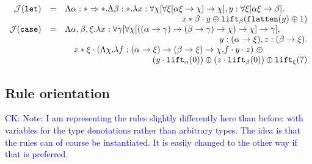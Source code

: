 \documentclass[runningheads,a4paper]{llncs}
\newcommand{\Termmap}{\mathcal{J}}
\newcommand{\quant}[2]{\forall #1[#2]}
\newcommand{\arrtype}{\rightarrow}
\newcommand{\arrkind}{\Rightarrow}
\newcommand{\abs}[2]{\lambda #1.#2}
\newcommand{\flatten}{\mathtt{flatten}}
\newcommand{\lift}{\mathtt{lift}}
\newcommand{\CK}[1]{\textcolor{blue}{CK: #1}}
\begin{document}
\[
\begin{array}{rcl}
\Termmap(\mathtt{let}) & = & \Lambda \alpha : * \arrkind * . \Lambda \beta : * . \lambda x : \quant{\chi}{
  \quant{\xi}{\alpha\xi \arrtype \chi} \arrtype \chi},
  y : \quant{\xi}{\alpha\xi \arrtype \beta}. \\
  & & \hfill x * \beta \cdot y \oplus \lift_{\beta}(\flatten(y) \oplus
  1) \\
\Termmap(\mathtt{case}) & = & \Lambda \alpha,\beta,\xi . \lambda x :
  \quant{\gamma}{\quant{\chi}{((\alpha \arrtype \gamma) \arrtype (\beta
  \arrtype \gamma) \arrtype \chi) \arrtype \chi} \arrtype \gamma},\\
  & & \phantom{A}\hfill
  y : (\alpha \arrtype \xi), z : (\beta \arrtype \xi). \\
  & & \quad
  x * \xi \cdot (\Lambda \chi.\abs{f:(\alpha \arrtype \xi) \arrtype
  (\beta \arrtype \xi) \arrtype \chi}{f \cdot y \cdot z})\ \oplus \\
  & & \quad\phantom{ABCDEFGHIJKL}
    (y \cdot \lift_\alpha(0)) \oplus (z \cdot \lift_\beta(0)) \oplus
    \lift_\xi(7) \\
\end{array}
\]

\subsection{Rule orientation}

\CK{Note: I am representing the rules slightly differently here than
before: with variables for the type denotations rather than arbitrary
types.  The idea is that the rules can of course be instantiated.  It
is easily changed to the other way if that is preferred.}
\end{document}
